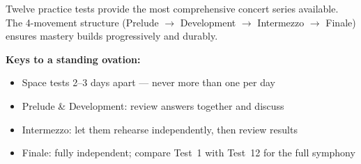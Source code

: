 {%
\begin{tcolorbox}[
    enhanced,
    colback=musBurgundy!5,
    colframe=musBurgundy!30,
    arc=6pt, boxrule=0.8pt,
    left=5mm, right=5mm, top=4mm, bottom=4mm,
    title={\textcolor{white}{\faHeart~Patron's Guide (for Parents \& Guardians)}},
    colbacktitle=musBurgundy!70,
    fonttitle=\bfseries\sffamily,
    borderline west={3pt}{0pt}{musBurgundy!45},
]
    \small\color{musBlack}
    Twelve practice tests provide the most comprehensive concert series available.
    The 4-movement structure (Prelude $\to$ Development $\to$ Intermezzo $\to$ Finale)
    ensures mastery builds progressively and durably.

    \medskip
    \textbf{Keys to a standing ovation:}
    \begin{itemize}[leftmargin=*, itemsep=1pt]
        \item Space tests 2--3 days apart --- never more than one per day
        \item Prelude \& Development: review answers together and discuss
        \item Intermezzo: let them rehearse independently, then review results
        \item Finale: fully independent; compare Test~1 with Test~12 for the full symphony
    \end{itemize}
\end{tcolorbox}

}

\newpage
